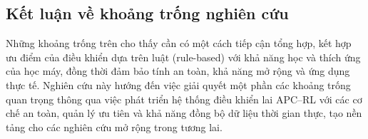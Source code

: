 \subsection{Kết luận về khoảng trống nghiên cứu}

Những khoảng trống trên cho thấy cần có một cách tiếp cận tổng hợp, kết hợp ưu điểm của điều khiển dựa trên luật (rule-based) với khả năng học và thích ứng của học máy, đồng thời đảm bảo tính an toàn, khả năng mở rộng và ứng dụng thực tế. Nghiên cứu này hướng đến việc giải quyết một phần các khoảng trống quan trọng thông qua việc phát triển hệ thống điều khiển lai APC--RL với các cơ chế an toàn, quản lý ưu tiên và khả năng đồng bộ dữ liệu thời gian thực, tạo nền tảng cho các nghiên cứu mở rộng trong tương lai.